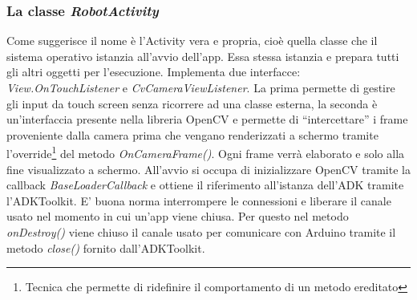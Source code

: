 \subsubsection{La classe \emph{RobotActivity}}
Come suggerisce il nome è l'Activity vera e propria, cioè quella classe che il 
sistema operativo istanzia all'avvio dell'app. Essa stessa istanzia e prepara tutti gli 
altri oggetti per l'esecuzione. Implementa due interfacce: \textit{View.OnTouchListener} 
e \textit{CvCameraViewListener}. 
La prima permette di gestire gli input da touch screen senza ricorrere ad una classe esterna,
la seconda è un'interfaccia presente nella libreria OpenCV e permette di ``intercettare''
i frame proveniente dalla camera prima che vengano renderizzati a schermo tramite 
l'override\footnote{Tecnica che permette di ridefinire il comportamento di un metodo 
ereditato} del metodo \textit{OnCameraFrame()}. Ogni frame verrà elaborato e solo alla
fine visualizzato a schermo.
All'avvio si occupa di inizializzare OpenCV tramite la 
callback \textit{BaseLoaderCallback} e ottiene il riferimento all'istanza dell'ADK
tramite l'ADKToolkit. E' buona norma interrompere le connessioni e liberare il canale usato 
nel momento in cui un'app viene chiusa. Per questo nel metodo \emph{onDestroy()} 
viene chiuso il canale usato per comunicare con Arduino tramite il metodo \emph{close()}
fornito dall'ADKToolkit.

